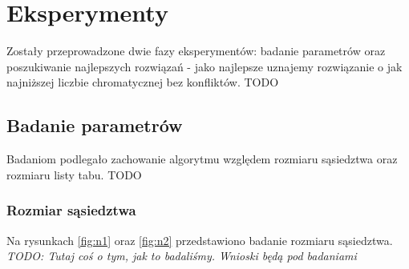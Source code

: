 \documentclass[12pt,a4paper]{article}
\begin{document}
\section{Eksperymenty}
Zostały przeprowadzone dwie fazy eksperymentów: badanie parametrów oraz poszukiwanie najlepszych rozwiązań - jako najlepsze uznajemy rozwiązanie o jak najniższej liczbie chromatycznej bez konfliktów. TODO

\subsection{Badanie parametrów}
Badaniom podlegało zachowanie algorytmu względem rozmiaru sąsiedztwa oraz rozmiaru listy tabu. TODO

\subsubsection{Rozmiar sąsiedztwa}
Na rysunkach \ref{fig:n1} oraz \ref{fig:n2} przedstawiono badanie rozmiaru sąsiedztwa. \textit{TODO: Tutaj coś o tym, jak to badaliśmy. Wnioski będą pod badaniami}
\end{document}
